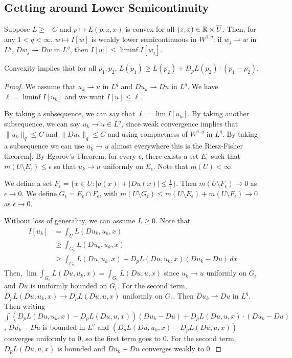 \documentclass[12pt]{scrartcl}
\newcommand{\R}{\mathbb{R}}
\newcommand{\<}{\langle}
\renewcommand{\>}{\rangle}
\let \weakto \rightharpoonup
\begin{document}
\subsection{Getting around Lower Semicontinuity}
\begin{thm} Suppose $L \ge -C$ and $p \mapsto L(p, z, x)$ is convex for all $(z, x) \in \R \times \ol{U}$.  Then, for any $1 < q < \infty$, $w \mapsto I[w]$ is weakly lower semicontinuous in $W^{1, q}$: if $w_j \weakto w$ in $L^q$, $Dw_j \rightharpoonup Dw$ in $L^q$, then $I[w] \le \liminf I[w_j]$.
\end{thm}
\begin{remark} 
Convexity implies that for all $p_1, p_2$, $L(p_1) \ge L(p_2) + D_pL(p_2) \cdot (p_1-p_2)$.
\end{remark}
\begin{proof}
We assume that $u_k \weakto u$ in $L^q$ and $Du_k \weakto Du$ in $L^q$.  We have $\ell = \liminf I[u_k]$ and we want $I[u] \le \ell$.

By taking a subsequence, we can say that $\ell = \lim I[u_k]$.  By taking another subsequence, we can say $u_k \to u \in L^q$, since weak convergence implies that $\|u_k\|_{q} \le C$ and $\|Du_k\|_q \le C$ and using compactness of $W^{1, q}$ in $L^q$. By taking a subsequence we can use $u_k \to u$ almost everywhere[this is the Riesz-Fisher theorem].  By Egorov's Theorem, for every $\epsilon$, there exists a set $E_\epsilon$ such that $m(U \setminus E_\epsilon) \le \epsilon$  so that $u_k \to u$ uniformly on $E_\epsilon$.  Note that $m(U) < \infty$.

We define a set $F_\epsilon = \{x \in U : |u(x)| + |Du(x)| \le \frac{1}{\epsilon}\}$.  Then $m(U \setminus F_\epsilon) \to 0$ as $\epsilon \to 0$.  We define $G_\epsilon = E_\epsilon \cap F_\epsilon$, with $m(U \setminus G_\epsilon) \le m(U \setminus E_\epsilon) + m(U \setminus F_\epsilon) \to 0$ as $\epsilon \to 0$.  

Without loss of generality, we can assume $L \ge 0$.  Note that 
\begin{align*}
I[u_k] &= \int_U L(Du_{k}, u_k, x) \\
&\ge \int_{G_\epsilon} L(Du_k, u_k, x) \\
&\ge \int_{G_\epsilon} L(Du, u_k, x) + D_pL(Du, u_k, x)(Du_k - Du)\,dx
\end{align*}
Then, $\lim \int_{G_\epsilon} L(Du, u_k, x) = \int_{G_\epsilon} L(Du, u, x)$ since $u_k \to u$ uniformly on $G_\epsilon$ and $Du$ is uniformly bounded on $G_\epsilon$.  For the second term, $D_pL(Du, u_k, x) \to D_pL(Du, u, x)$ uniformly on $G_\epsilon$.  Then $Du_k \weakto Du$ in $L^q$.  Then writing $\int (D_pL(Du, u_k, x) - D_pL(Du, u, x))(Du_k - Du) + D_pL(Du, u, x) \cdot (Du_k - Du)$, $Du_k - Du$ is bounded in $L^q$ and $(D_pL(Du, u_k, x) - D_pL(Du, u, x))$ converges uniformly to $0$, so the first term goes to $0$.  For the second term, $D_pL(Du, u, x)$ is bounded and $Du_k - Du$ converges weakly to $0$.  


\end{proof}
\end{document}
